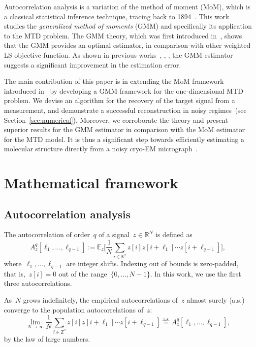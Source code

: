 \documentclass{article}
\begin{document}
Autocorrelation analysis is a variation of the method of moment (MoM), which is a classical statistical inference technique, tracing back to 1894~\cite{pearson1894contributions}. This work studies the \textit{generalized method of moments} (GMM) and specifically its application to the MTD problem. The GMM theory, which was first introduced in~\cite{Hansen1982}, shows that the GMM provides an optimal estimator, in comparison with other weighted LS objective function. As shown in previous works~\cite{abas2021generalized}, \cite{fan2018optimal}, \cite{roodman2009xtabond2}, the GMM estimator suggests a significant improvement in the estimation error.

The main contribution of this paper is in extending the MoM framework introduced in~\cite{bendory2019multi} by developing a GMM framework for the one-dimensional MTD problem. We devise an algorithm for the recovery of the target signal from a measurement, and demonstrate a successful reconstruction in noisy regimes~(see Section~\ref{sec:numerical}). Moreover, we corroborate the theory and present superior results for the GMM estimator in comparison with the MoM estimator for the MTD model. It is thus a significant step towards efficiently estimating a molecular structure directly from a noisy \mbox{cryo-EM} micrograph~\cite{bendory2018toward}.

\section{Mathematical framework}
\label{sec:math}
\subsection{Autocorrelation analysis}
\label{subsec:ac}
The autocorrelation of order~$q$ of a signal~\mbox{$z \in \mathbb{R}^{N}$} is defined as
\begin{equation}
A_z^q[\ell_1, \ldots, \ell_{q-1}] := \mathbb{E}_z\Big[\frac{1}{N} \sum_{i \in \mathbb{R}^2} z[i] z[i + \ell_1] \cdots z[i + \ell_{q-1}]\Big],
\end{equation}
where~$\ell_1, \ldots, \ell_{q-1}$ are integer shifts. Indexing out of bounds is zero-padded, that is,~\mbox{$z[i] = 0$} out of the range~\mbox{$\{0, \ldots, {N-1}\}$}. In this work, we use the first three autocorrelations.

As~$N$ grows indefinitely, the empirical autocorrelations of~$z$ almost surely (a.s.) converge to the population autocorrelations of~$z$:
\begin{equation}
\lim_{N \rightarrow \infty} \frac{1}{N} \sum_{i \in \mathbb{Z}^2} z[i] z[i + \ell_1] \cdots z[i + \ell_{q-1}] \stackrel{\text{a.s.}}{=}A_z^q[\ell_1, \ldots, \ell_{q-1}],
\end{equation}
by the law of large numbers.
\end{document}
